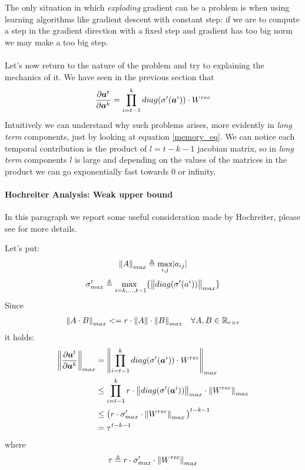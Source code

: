 The only situation in which \textit{exploding} gradient can be a problem is  when using learning algorithms like gradient descent with constant step:
if we are to compute a step in the gradient direction with a fixed step and gradient has too big norm we may make a too big step.
\\\\
Let's now return to the nature of the problem and try to explaining the mechanics of it.
We have seen in the previous section that
\begin{equation}
\frac{\partial \boldsymbol{a}^t}{\partial \boldsymbol{a}^k} = \prod_{i=t-1}^{k}  diag(\sigma'(\boldsymbol{a}^i)) \cdot W^{rec}
\label{memory_eq}
\end{equation}
Intuitively we can understand why such problems arises, more evidently in \textit{long term} components, just by looking at equation \ref{memory_eq}.
We can notice each temporal contribution is the product of $l=t-k-1$ jacobian matrix, so in \textit{long term} components $l$ is large and depending on
the values of the matrices in the product we can go exponentially fast towards 0 or infinity.

\paragraph{Hochreiter Analysis: Weak upper bound}
In this paragraph we report some useful consideration made by Hochreiter, please see \cite{Hochreiter95longshort-term} for more details.

Let's put:
$$\left\Vert A \right\Vert_{max}\triangleq \underset{i,j}{\text{max}}|a_{ij}| $$
$$\sigma'_{max} \triangleq \underset{i=k,...,t-1}{\text{max  }} \{\left\Vert diag(\sigma'(a^i)) \right\Vert_{max}\}$$
Since
\begin{align}
\left\Vert A\cdot B \right\Vert_{max} &<= r \cdot \left\Vert A \right\Vert\cdot \left\Vert B \right\Vert_{max} & \forall A,B \in \mathbb{R}_{r\times r} 
\end{align}
it holds:
\begin{align}
\left\Vert \frac{\partial \boldsymbol{a}^t}{\partial \boldsymbol{a}^k} \right\Vert_{max} &= \left\Vert  \prod_{i=t-1}^{k}  diag(\sigma'(\boldsymbol{a}^i)) \cdot W^{rec}  \right\Vert_{max}\\
&\leq \prod_{i=t-1}^{k} r \cdot \left\Vert diag(\sigma'(\boldsymbol{a}^i)) \right\Vert_{max} \cdot \left\Vert W^{rec} \right\Vert_{max}\\
&\leq \big(r \cdot \sigma'_{max} \cdot \left\Vert W^{rec} \right\Vert_{max}\big)^{t-k-1} \\
&= \tau^{t-k-1}
\end{align}
where $$\tau \triangleq r \cdot \sigma'_{max} \cdot \left\Vert W^{rec} \right\Vert_{max}$$

